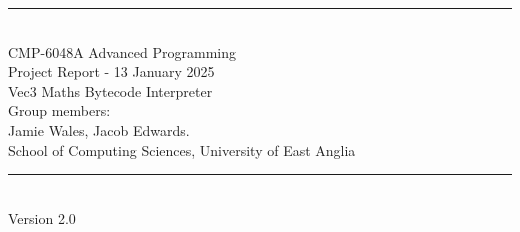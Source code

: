 \documentclass[a4paper, oneside, 11pt]{report}
\begin{document}
\begin{titlepage}
\begin{center}
\rule{12cm}{1mm} \\
\vspace{1cm}
{\large  CMP-6048A Advanced Programming} %
\vspace{7.5cm}
\\{\Large Project Report - 13 January 2025}
\vspace{1.5cm}
\\{\LARGE Vec3 Maths Bytecode Interpreter} %
\vspace{1.0cm}
\\{\Large Group members: \\ Jamie Wales, Jacob Edwards.\ }
\vspace{10.0cm}
\\{\large School of Computing Sciences, University of East Anglia}
\\ \rule{12cm}{0.5mm}
\\ \hspace{8.5cm} {\large Version 2.0}
\end{center}
\end{titlepage}


\setcounter{page}{1}
\end{document}
